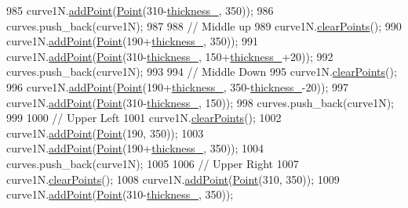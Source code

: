 \begin{DoxyCode}
985     curve1N.\mbox{\hyperlink{class_bezier_curve_a38d16c18b36ae45619b05e26e226cf34}{addPoint}}(\mbox{\hyperlink{class_point}{Point}}(310-\mbox{\hyperlink{class_font_v1_aed8040e76be9a52833627b92f0fb4e5f}{thickness\_}}, 350));
986     curves.push\_back(curve1N);
987 
988     \textcolor{comment}{// Middle up}
989     curve1N.\mbox{\hyperlink{class_bezier_curve_a0ba8ce66d5af5971ae6a1b506029728e}{clearPoints}}();
990     curve1N.\mbox{\hyperlink{class_bezier_curve_a38d16c18b36ae45619b05e26e226cf34}{addPoint}}(\mbox{\hyperlink{class_point}{Point}}(190+\mbox{\hyperlink{class_font_v1_aed8040e76be9a52833627b92f0fb4e5f}{thickness\_}}, 350));
991     curve1N.\mbox{\hyperlink{class_bezier_curve_a38d16c18b36ae45619b05e26e226cf34}{addPoint}}(\mbox{\hyperlink{class_point}{Point}}(310-\mbox{\hyperlink{class_font_v1_aed8040e76be9a52833627b92f0fb4e5f}{thickness\_}}, 150+\mbox{\hyperlink{class_font_v1_aed8040e76be9a52833627b92f0fb4e5f}{thickness\_}}+20));
992     curves.push\_back(curve1N);
993 
994     \textcolor{comment}{// Middle Down}
995     curve1N.\mbox{\hyperlink{class_bezier_curve_a0ba8ce66d5af5971ae6a1b506029728e}{clearPoints}}();
996     curve1N.\mbox{\hyperlink{class_bezier_curve_a38d16c18b36ae45619b05e26e226cf34}{addPoint}}(\mbox{\hyperlink{class_point}{Point}}(190+\mbox{\hyperlink{class_font_v1_aed8040e76be9a52833627b92f0fb4e5f}{thickness\_}}, 350-\mbox{\hyperlink{class_font_v1_aed8040e76be9a52833627b92f0fb4e5f}{thickness\_}}-20));
997     curve1N.\mbox{\hyperlink{class_bezier_curve_a38d16c18b36ae45619b05e26e226cf34}{addPoint}}(\mbox{\hyperlink{class_point}{Point}}(310-\mbox{\hyperlink{class_font_v1_aed8040e76be9a52833627b92f0fb4e5f}{thickness\_}}, 150));
998     curves.push\_back(curve1N);
999 
1000     \textcolor{comment}{// Upper Left}
1001     curve1N.\mbox{\hyperlink{class_bezier_curve_a0ba8ce66d5af5971ae6a1b506029728e}{clearPoints}}();
1002     curve1N.\mbox{\hyperlink{class_bezier_curve_a38d16c18b36ae45619b05e26e226cf34}{addPoint}}(\mbox{\hyperlink{class_point}{Point}}(190, 350));
1003     curve1N.\mbox{\hyperlink{class_bezier_curve_a38d16c18b36ae45619b05e26e226cf34}{addPoint}}(\mbox{\hyperlink{class_point}{Point}}(190+\mbox{\hyperlink{class_font_v1_aed8040e76be9a52833627b92f0fb4e5f}{thickness\_}}, 350));
1004     curves.push\_back(curve1N);
1005 
1006     \textcolor{comment}{// Upper Right}
1007     curve1N.\mbox{\hyperlink{class_bezier_curve_a0ba8ce66d5af5971ae6a1b506029728e}{clearPoints}}();
1008     curve1N.\mbox{\hyperlink{class_bezier_curve_a38d16c18b36ae45619b05e26e226cf34}{addPoint}}(\mbox{\hyperlink{class_point}{Point}}(310, 350));
1009     curve1N.\mbox{\hyperlink{class_bezier_curve_a38d16c18b36ae45619b05e26e226cf34}{addPoint}}(\mbox{\hyperlink{class_point}{Point}}(310-\mbox{\hyperlink{class_font_v1_aed8040e76be9a52833627b92f0fb4e5f}{thickness\_}}, 350));

\end{DoxyCode}
